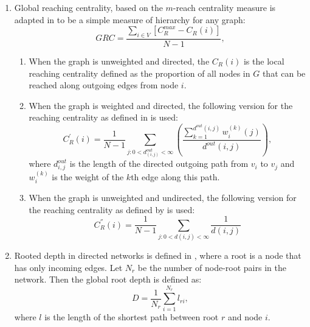 \documentclass[3p,times]{elsarticle}
\begin{document}
\begin{enumerate}
	\item Global reaching centrality, based on the $m$-reach centrality measure is adapted in \cite{GRC} to be a simple measure of hierarchy for any graph:
		$$
		GRC=\frac{\sum_{i\in V}{[C_R^{max}-C_R(i)]}}{N-1},
		$$
		\begin{enumerate}
			\item When the graph is unweighted and directed, the $C_R(i)$ is the local reaching centrality defined as the proportion of all nodes in $G$ that can be reached along 
				outgoing edges from node $i$.
			\item When the graph is weighted and directed, the following version for the reaching centrality as defined in \cite{GRC} is used:
				$$
				C_{R}^{'}(i)=\frac{1}{N-1}\sum_{j: 0<d^{out}_{(i,j)}<\infty}{( \frac{\sum_{k=1}^{d^{out}(i,j)} {w_{i}^{(k)} (j) } }{d^{out}(i,j)} )},
				$$
				where $d^{out}_{i,j}$ is the length of the directed outgoing path from $v_{i}$ to $v_{j}$ and $w^{(k)}_{i}$ is the weight of the $k$th edge along this path. 
			\item When the graph is unweighted and undirected, the following version for the reaching centrality as defined by \cite{GRC} is used:
				$$
				C_{R}^{''}(i)=\frac{1}{N-1}\sum_{j:0<d(i,j)<\infty}{\frac{1}{d(i,j)}}
				$$
		\end{enumerate}
	
	\item Rooted depth in directed networks is defined in \cite{depth}, where a root is a node that has only incoming edges. Let $N_{r}$ be the number of node-root pairs in the network. Then the global root depth is defined as:
		$$
		D=\frac{1}{N_{r}}\sum_{i=1}^{N_r}{l_{ri}},	
		$$
		where $l$ is the length of the shortest path between root $r$ and node $i$.
\end{enumerate}
\end{document}
